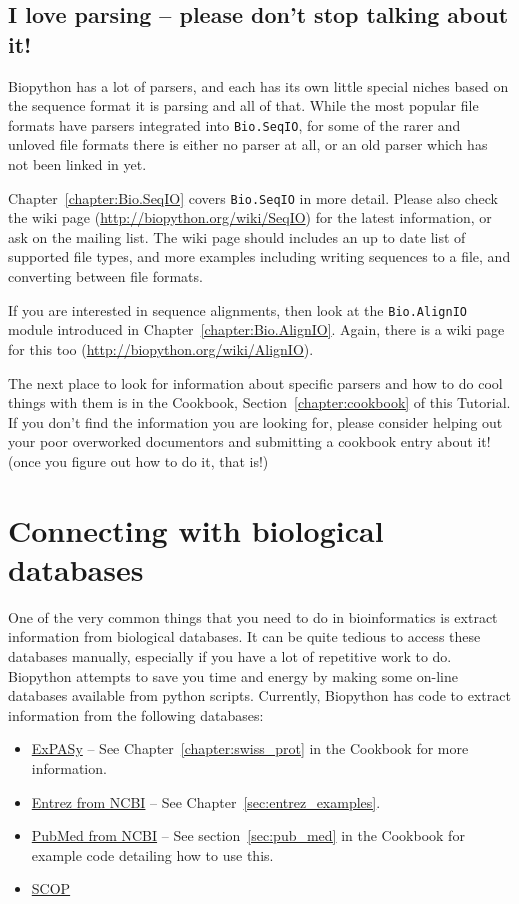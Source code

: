 \documentclass{report}
\begin{document}
\subsection{I love parsing -- please don't stop talking about it!}

Biopython has a lot of parsers, and each has its own little special niches based on the sequence format it is parsing and all of that.  While the most popular file formats have parsers integrated into \verb|Bio.SeqIO|, for some of the rarer and unloved file formats there is either no parser at all, or an old parser which has not been linked in yet.

Chapter~\ref{chapter:Bio.SeqIO} covers \verb|Bio.SeqIO| in more detail.  Please also check the wiki page (\url{http://biopython.org/wiki/SeqIO}) for the latest information, or ask on the mailing list. The wiki page should includes an up to date list of supported file types, and more examples including writing sequences to a file, and converting between file formats.

If you are interested in sequence alignments, then look at the \verb|Bio.AlignIO| module introduced in Chapter~\ref{chapter:Bio.AlignIO}.  Again, there is a wiki page for this too (\url{http://biopython.org/wiki/AlignIO}).

The next place to look for information about specific parsers and how to do cool things with them is in the Cookbook, Section~\ref{chapter:cookbook} of this Tutorial. If you don't find the information you are looking for, please consider helping out your poor overworked documentors and submitting a cookbook entry about it! (once you figure out how to do it, that is!)

\section{Connecting with biological databases}
\label{sec:connecting-with-biological-databases}

One of the very common things that you need to do in bioinformatics is extract information from biological databases. It can be quite tedious to access these databases manually, especially if you have a lot of repetitive work to do. Biopython attempts to save you time and energy by making some on-line databases available from python scripts. Currently, Biopython has code to extract information from the following databases:

\begin{itemize}
  \item \href{http://www.expasy.org/}{ExPASy} -- See Chapter~\ref{chapter:swiss_prot} in the Cookbook for more information.
  \item \href{http://www.ncbi.nlm.nih.gov/Entrez/}{Entrez from NCBI} -- See Chapter~\ref{sec:entrez_examples}.
  \item \href{http://www.ncbi.nlm.nih.gov/PubMed/}{PubMed from NCBI} -- See section~\ref{sec:pub_med} in the Cookbook for example code detailing how to use this.
  \item \href{http://scop.mrc-lmb.cam.ac.uk/scop/}{SCOP}
\end{itemize}
\end{document}
